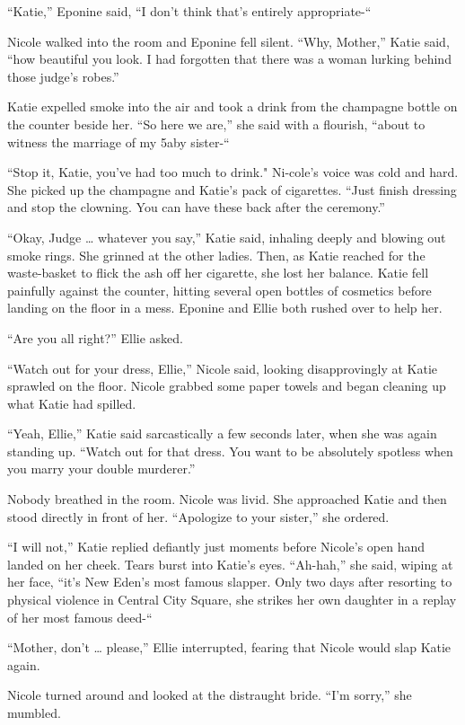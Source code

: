 \documentclass[]{article}
\begin{document}
{“Katie,” Eponine said, “I don’t think that’s entirely appropriate-“

Nicole walked into the room and Eponine fell silent.  “Why, Mother,” Katie said, “how beautiful you look.  I had forgotten that there was a woman lurking behind those judge’s robes.”

Katie expelled smoke into the air and took a drink from the champagne bottle on the counter beside her.  “So here we are,” she said with a flourish, “about to witness the marriage of my 5aby sister-“

“Stop it, Katie, you’ve had too much to drink."  Ni-cole’s voice was cold and hard.  She picked up the champagne and Katie’s pack of cigarettes.  “Just finish dressing and stop the clowning.  You can have these back after the ceremony.”

“Okay, Judge … whatever you say,” Katie said, inhaling deeply and blowing out smoke rings.  She grinned at the other ladies.  Then, as Katie reached for the waste-basket to flick the ash off her cigarette, she lost her balance.  Katie fell painfully against the counter, hitting several open bottles of cosmetics before landing on the floor in a mess.  Eponine and Ellie both rushed over to help her.

“Are you all right?” Ellie asked.

“Watch out for your dress, Ellie,” Nicole said, looking disapprovingly at Katie sprawled on the floor.  Nicole grabbed some paper towels and began cleaning up what Katie had spilled.

“Yeah, Ellie,” Katie said sarcastically a few seconds later, when she was again standing up.  “Watch out for that dress.  You want to be absolutely spotless when you marry your double murderer.”

Nobody breathed in the room.  Nicole was livid.  She approached Katie and then stood directly in front of her.  “Apologize to your sister,” she ordered.

“I will not,” Katie replied defiantly just moments before Nicole’s open hand landed on her cheek.  Tears burst into Katie’s eyes.  “Ah-hah,” she said, wiping at her face, “it’s New Eden’s most famous slapper.  Only two days after resorting to physical violence in Central City Square, she strikes her own daughter in a replay of her most famous deed-“

“Mother, don’t … please,” Ellie interrupted, fearing that Nicole would slap Katie again.

Nicole turned around and looked at the distraught bride.  “I’m sorry,” she mumbled.

}
\end{document}
